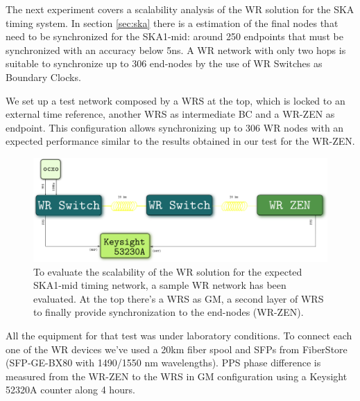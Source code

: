 The next experiment covers a scalability analysis of the WR solution for the 
SKA timing system. In section \ref{sec:ska} there is a estimation of the final 
nodes that need to be synchronized for the SKA1-mid: around 250 endpoints that 
must be synchronized with an accuracy below 5ns. A WR network with only two 
hops is suitable to synchronize up to 306 end-nodes by the use of WR Switches as 
Boundary Clocks.

We set up a test network composed by a WRS at the top, which is locked to an 
external time reference, another WRS as intermediate BC and a WR-ZEN as 
endpoint. This configuration allows synchronizing up to 306 WR nodes with an 
expected performance similar to the results obtained in our test for the WR-ZEN.

\begin{figure}
	\centering
	\includegraphics[width=0.7\linewidth]{img/prueba_red}
	\caption[WR Scalability test's setup for SKA]{To evaluate the scalability 
	of the WR solution for the expected SKA1-mid timing network, a sample WR 
	network has been evaluated. At the top there's a WRS as GM, a second layer 
	of WRS to finally provide synchronization to the end-nodes (WR-ZEN).}
	\label{fig:pruebared}
\end{figure}


All the equipment for that test was under laboratory conditions. To connect 
each one of the WR devices we've used a 20km fiber spool and SFPs from 
FiberStore (SFP-GE-BX80 with 1490/1550 nm wavelengths). PPS phase difference is 
measured from the WR-ZEN to the WRS in GM configuration using a Keysight 52320A 
counter along 4 hours.

